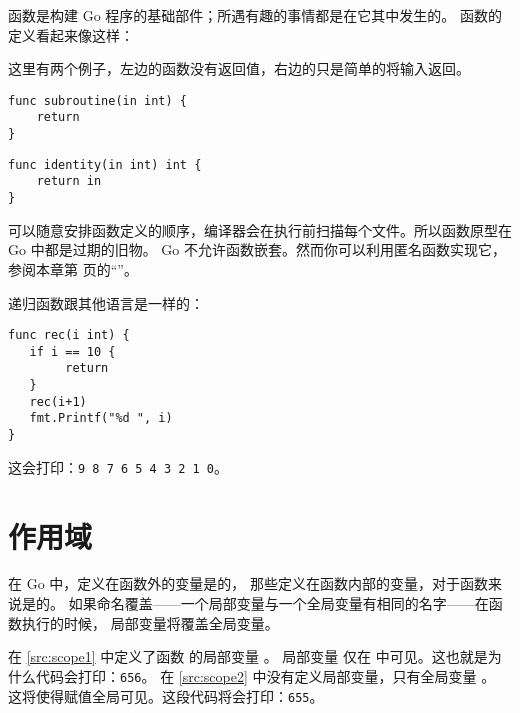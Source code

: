 
\noindent{}函数是构建 Go 程序的基础部件；所遇有趣的事情都是在它其中发生的。
函数的定义看起来像这样：

\showremarks
这里有两个例子，左边的函数没有返回值，右边的只是简单的将输入返回。

\begin{minipage}{.5\textwidth}
\begin{lstlisting}
func subroutine(in int) {
    return
}
\end{lstlisting}
\end{minipage}
\begin{minipage}{.5\textwidth}
\begin{lstlisting}
func identity(in int) int {
    return in
}
\end{lstlisting}
\end{minipage}

可以随意安排函数定义的顺序，编译器会在执行前扫描每个文件。所以函数原型在 Go 中都是过期的旧物。
Go 不允许函数嵌套。然而你可以利用匿名函数实现它，参阅本章第 \pageref{sec:functions as values}
页的“”。


递归函数跟其他语言是一样的：
\begin{lstlisting}[caption=递归函数]
func rec(i int) {
   if i == 10 {
        return
   }
   rec(i+1)
   fmt.Printf("%d ", i)
}
\end{lstlisting}
这会打印：\texttt{9 8 7 6 5 4 3 2 1 0}。
\section{作用域}
在 Go 中，定义在函数外的变量是的，
那些定义在函数内部的变量，对于函数来说是的。
如果命名覆盖——一个局部变量与一个全局变量有相同的名字——在函数执行的时候，
局部变量将覆盖全局变量。

\begin{minipage}{.5\textwidth}

\hfill
\vfill
\end{minipage}
\hfill
\begin{minipage}{.5\textwidth}

\hfill
\vfill
\end{minipage}

在 \ref{src:scope1} 中定义了函数  的局部变量 。
局部变量  仅在  中可见。这也就是为什么代码会打印：\texttt{656}。
在 \ref{src:scope2} 中没有定义局部变量，只有全局变量 。
这将使得赋值全局可见。这段代码将会打印：\texttt{655}。

